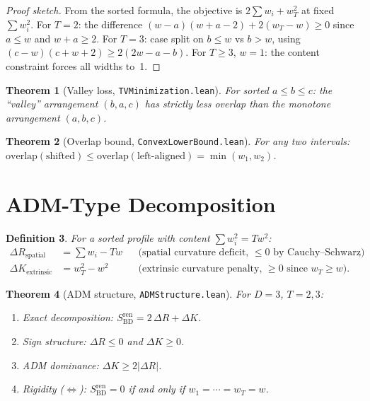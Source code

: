 \documentclass[11pt,a4paper]{article}
\newtheorem{theorem}{Theorem}[section]
\newtheorem{definition}[theorem]{Definition}
\theoremstyle{remark}
\begin{document}
\begin{proof}[Proof sketch]
From the sorted formula, the objective is $2\sum w_i + w_T^2$ at fixed
$\sum w_i^2$. For $T = 2$: the difference
$(w{-}a)(w{+}a{-}2) + 2(w_T{-}w) \geq 0$ since $a \leq w$ and
$w{+}a \geq 2$. For $T = 3$: case split on $b \leq w$ vs $b > w$, using
$(c{-}w)(c{+}w{+}2) \geq 2(2w{-}a{-}b)$. For $T \geq 3$, $w = 1$: the
content constraint forces all widths to~1.
\end{proof}

\begin{theorem}[Valley loss, \texttt{TVMinimization.lean}]
\label{thm:valley}
For sorted $a \leq b \leq c$: the ``valley'' arrangement $(b,a,c)$ has
strictly less overlap than the monotone arrangement $(a,b,c)$.
\end{theorem}

\begin{theorem}[Overlap bound, \texttt{ConvexLowerBound.lean}]
For any two intervals: $\mathrm{overlap}(\text{shifted}) \leq
\mathrm{overlap}(\text{left-aligned}) = \min(w_1, w_2)$.
\end{theorem}

\section{ADM-Type Decomposition}\label{sec:adm}

\begin{definition}
For a sorted profile with content $\sum w_i^2 = Tw^2$:
\begin{align}
  \Delta R_{\mathrm{spatial}} &= \sum w_i - Tw
  &&\text{(spatial curvature deficit, $\leq 0$ by Cauchy--Schwarz)},\\
  \Delta K_{\mathrm{extrinsic}} &= w_T^2 - w^2
  &&\text{(extrinsic curvature penalty, $\geq 0$ since $w_T \geq w$)}.
\end{align}
\end{definition}

\begin{theorem}[ADM structure, \texttt{ADMStructure.lean}]
\label{thm:adm}
For $D = 3$, $T = 2, 3$:
\begin{enumerate}
\item \emph{Exact decomposition}:
  $S_{\mathrm{BD}}^{\mathrm{ren}} = 2\,\Delta R + \Delta K$.
\item \emph{Sign structure}: $\Delta R \leq 0$ and $\Delta K \geq 0$.
\item \emph{ADM dominance}: $\Delta K \geq 2|\Delta R|$.
\item \emph{Rigidity} ($\iff$): $S_{\mathrm{BD}}^{\mathrm{ren}} = 0$
  if and only if $w_1 = \cdots = w_T = w$.
\end{enumerate}
\end{theorem}
\end{document}
